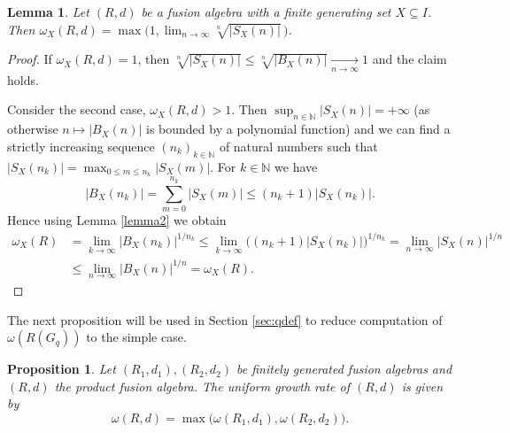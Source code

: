 \documentclass[11 pt, leqno]{amsart}
\newcommand{\NN}{\mathbb{N}}
\newtheorem{proposition}[theorem]{Proposition}
\newtheorem{lemma}[theorem]{Lemma}
\theoremstyle{definition}
\numberwithin{equation}{section}
\begin{document}
\begin{lemma}\label{lemma3}
Let $(R,d)$ be a fusion algebra with a finite generating set $X\subseteq I$. Then $\omega_X(R,d)=\max\bigl( 1 , \lim_{n\to\infty} \sqrt[n]{|S_X(n)|}\,\bigr)$.
\end{lemma}

\begin{proof}
If $\omega_X(R,d)=1$, then $\sqrt[n]{|S_X(n)|}\le \sqrt[n]{|B_X(n)|}\xrightarrow[n\to\infty]{}1$ and the claim holds.

Consider the second case, $\omega_X(R,d)>1$. Then $\sup_{n\in\NN}|S_X(n)|=+\infty$ (as otherwise $n\mapsto |B_X(n)|$ is bounded by a polynomial function) and we can find a strictly increasing sequence $(n_k)_{k\in\NN}$ of natural numbers such that $|S_{X}(n_k)| = \max_{0\le m \le n_k } |S_{X}(m)|$. For $k\in\NN$ we have
\[
|B_X(n_k)|=\sum_{m=0}^{n_k} |S_X(m)| \le 
(n_k+1) |S_X(n_k)|.
\]
Hence using Lemma \ref{lemma2} we obtain
\begin{align*}
\omega_X(R)&=\lim_{k\to\infty}|B_X(n_k)|^{1/n_k}\le 
\lim_{k\to\infty}\bigl((n_k+1)|S_X(n_k)|\bigr)^{1/n_k}=\lim_{n\to\infty}|S_X(n)|^{1/n} \\
&\le 
\lim_{n\to\infty}|B_X(n)|^{1/n}=\omega_X(R).
\end{align*}
\end{proof}


The next proposition will be used in Section \ref{sec:qdef} to reduce computation of $\omega(R(G_q))$ to the simple case. 

\begin{proposition}\label{prop4}
Let $(R_1,d_1), (R_2,d_2)$ be finitely generated fusion algebras and $(R,d)$ the product fusion algebra. The uniform growth rate of $(R,d)$ is given by
\begin{equation}\label{eq2}
\omega(R,d)=\max\bigl( \omega(R_1,d_1), \omega(R_2,d_2)\bigr).
\end{equation}
\end{proposition}
\end{document}
